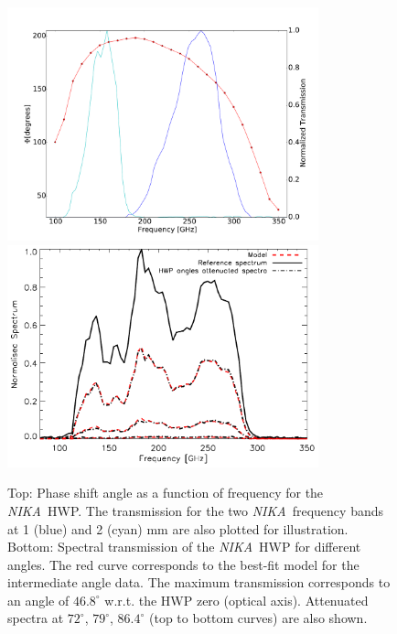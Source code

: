 \documentclass[twocolumn, traditabstract]{aa}
\newcommand{\nika}{{\it NIKA}}
\begin{document}
\begin{figure}[t!]
  \begin{center}
   \includegraphics[width=9cm, keepaspectratio]{figures/phase_shift_angle.pdf}
   \includegraphics[width=9cm, keepaspectratio]{figures/spectre.pdf}
    \caption{Top: Phase shift angle as a function of frequency for the \nika\ HWP. The transmission for the two \nika\ frequency bands
    at 1 (blue) and 2 (cyan) mm are also plotted for illustration. Bottom: 
    Spectral transmission of the \nika\ HWP for different angles. 
    The red curve corresponds to the best-fit model for the intermediate angle data. The maximum transmission
    corresponds to an angle of $46.8^{\circ}$ w.r.t. the HWP zero (optical axis). Attenuated spectra at $72^{\circ}$, $79^{\circ}$, $86.4^{\circ}$
     (top to bottom curves) are also shown.}
        \label{fig:spectre}
  \end{center}
\end{figure}
\end{document}
